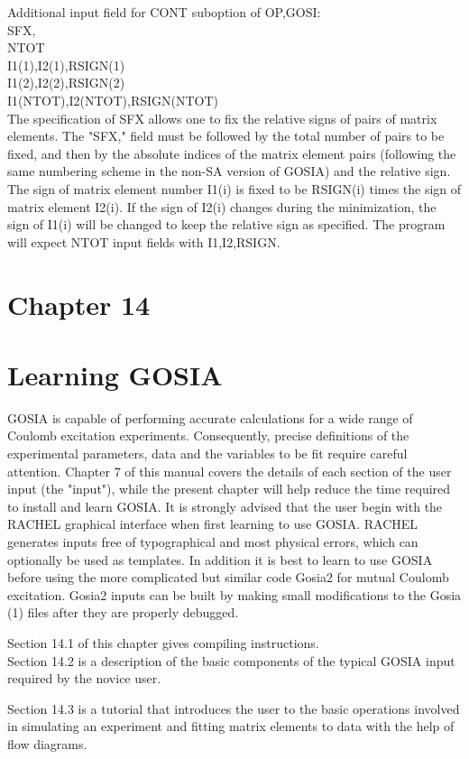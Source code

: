 \documentclass[10pt]{article}
\begin{document}
Additional input field for CONT suboption of OP,GOSI:\\
SFX,\\
NTOT\\
I1(1),I2(1),RSIGN(1)\\
I1(2),I2(2),RSIGN(2)\\
I1(NTOT),I2(NTOT),RSIGN(NTOT)\\
The specification of SFX allows one to fix the relative signs of pairs of matrix elements. The "SFX," field must be followed by the total number of pairs to be fixed, and then by the absolute indices of the matrix element pairs (following the same numbering scheme in the non-SA version of GOSIA) and the relative sign. The sign of matrix element number I1(i) is fixed to be RSIGN(i) times the sign of matrix element I2(i). If the sign of I2(i) changes during the minimization, the sign of I1(i) will be changed to keep the relative sign as specified. The program will expect NTOT input fields with I1,I2,RSIGN.

\section*{Chapter 14}
\section*{Learning GOSIA}
GOSIA is capable of performing accurate calculations for a wide range of Coulomb excitation experiments. Consequently, precise definitions of the experimental parameters, data and the variables to be fit require careful attention. Chapter 7 of this manual covers the details of each section of the user input (the "input"), while the present chapter will help reduce the time required to install and learn GOSIA. It is strongly advised that the user begin with the RACHEL graphical interface when first learning to use GOSIA. RACHEL generates inputs free of typographical and most physical errors, which can optionally be used as templates. In addition it is best to learn to use GOSIA before using the more complicated but similar code Gosia2 for mutual Coulomb excitation. Gosia2 inputs can be built by making small modifications to the Gosia (1) files after they are properly debugged.

Section 14.1 of this chapter gives compiling instructions.\\
Section 14.2 is a description of the basic components of the typical GOSIA input required by the novice user.

Section 14.3 is a tutorial that introduces the user to the basic operations involved in simulating an experiment and fitting matrix elements to data with the help of flow diagrams.
\end{document}
